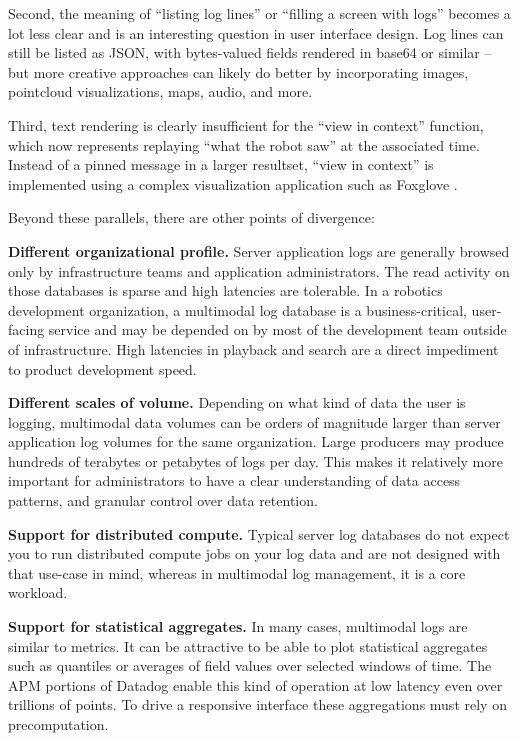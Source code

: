 \documentclass[9pt,twocolumn]{article}
\newcommand{\q}[1]{``#1''}
\begin{document}
    Second, the meaning of \q{listing log lines} or \q{filling a screen with
    logs} becomes a lot less clear and is an interesting question in user
    interface design. Log lines can still be listed as JSON, with bytes-valued
    fields rendered in base64 or similar – but more creative approaches can
    likely do better by incorporating images, pointcloud visualizations, maps,
    audio, and more.


    Third, text rendering is clearly insufficient for the \q{view in context}
    function, which now represents replaying \q{what the robot saw} at the
    associated time. Instead of a pinned message in a larger resultset, \q{view
    in context} is implemented using a complex visualization application such as
    Foxglove \cite{foxglove}.

    Beyond these parallels, there are other points of divergence:

    \textbf{Different organizational profile.} Server application logs are
    generally browsed only by infrastructure teams and application
    administrators. The read activity on those databases is sparse and high
    latencies are tolerable. In a robotics development organization, a
    multimodal log database is a business-critical, user-facing service and
    may be depended on by most of the development team outside of
    infrastructure. High latencies in playback and search are a direct
    impediment to product development speed.

    \textbf{Different scales of volume.} Depending on what kind of data the user
    is logging, multimodal data volumes can be orders of magnitude larger
    than server application log volumes for the same organization. Large
    producers may produce hundreds of terabytes or petabytes of logs per day.
    This makes it relatively more important for administrators to have a
    clear understanding of data access patterns, and granular control over
    data retention.

    \textbf{Support for distributed compute.} Typical server log databases do
    not expect you to run distributed compute jobs on your log data and are not
    designed with that use-case in mind, whereas in multimodal log management,
    it is a core workload.

    \textbf{Support for statistical aggregates.} In many cases, multimodal logs
    are similar to metrics. It can be attractive to be able to plot statistical
    aggregates such as quantiles or averages of field values over selected
    windows of time. The APM portions of Datadog enable this kind of operation
    at low latency even over trillions of points. To drive a responsive
    interface these aggregations must rely on precomputation.
\end{document}
